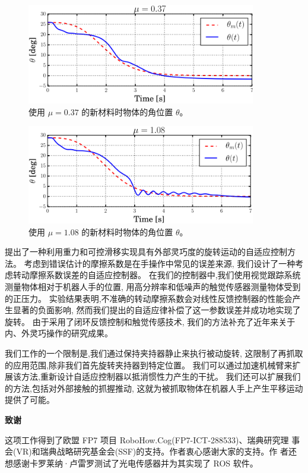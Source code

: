 \begin{figure}[!ht]
  \centering
  \includegraphics[width=10cm]{appendices/pic/5-9}
  \caption*{
    使用 $\mu= 0.37$ 的新材料时物体的角位置 $\theta$。}
  \vspace{-0.3cm}
\end{figure}


\begin{figure}[!ht]
  \centering
  \includegraphics[width=10cm]{appendices/pic/5-10}
  \caption*{
    使用 $\mu= 1.08$ 的新材料时物体的角位置 $\theta$。}
  \vspace{-0.3cm}
\end{figure}



提出了一种利用重力和可控滑移实现具有外部灵巧度的旋转运动的自适应控制方法。
考虑到错误估计的摩擦系数是在手操作中常见的误差来源,
我们设计了一种考虑转动摩擦系数误差的自适应控制器。
在我们的控制器中,我们使用视觉跟踪系统测量物体相对于机器人手的位置,
用高分辨率和低噪声的触觉传感器测量物体受到的正压力。
实验结果表明,不准确的转动摩擦系数会对线性反馈控制器的性能会产生显著的负面影响,
然而我们提出的自适应律补偿了这一参数误差并成功地实现了旋转。
由于采用了闭环反馈控制和触觉传感技术,
我们的方法补充了近年来关于内、外灵巧操作的研究成果。

我们工作的一个限制是,我们通过保持夹持器静止来执行被动旋转,
这限制了再抓取的应用范围,除非我们首先旋转夹持器到特定位置。
我们可以通过加速机械臂来扩展该方法,重新设计自适应控制器以抵消惯性力产生的干扰。
我们还可以扩展我们的方法,包括对外部接触的抓握推动,
这就为被抓取物体在机器人手上产生平移运动提供了可能。


\vspace{12bp}
\centerline{\heiti{}\bfseries
  致谢
  \vspace{8bp}
}

这项工作得到了欧盟 FP7 项目 RoboHow.Cog(FP7-ICT-288533)、瑞典研究理
事会(VR)和瑞典战略研究基金会(SSF)的支持。作者衷心感谢大家的支持。作
者还想感谢卡罗莱纳·卢雷罗测试了光电传感器并为其实现了 ROS 软件。


